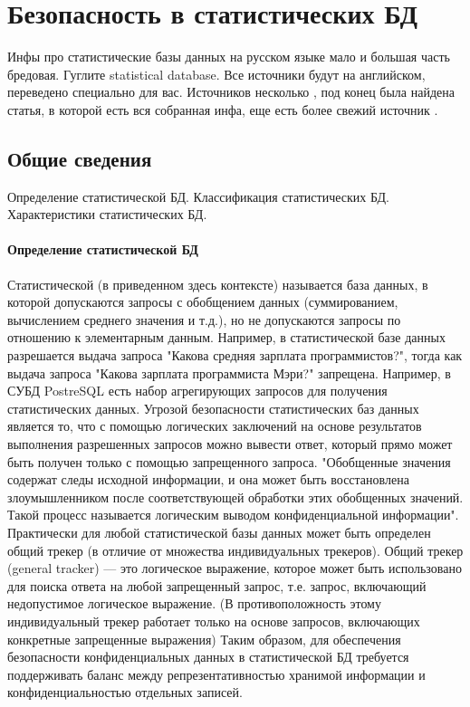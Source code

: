 \section{Безопасность в статистических БД}

Инфы про статистические базы данных на русском языке мало и большая часть бредовая. Гуглите statistical database. Все источники будут на английском, переведено специально для вас. Источников несколько \cite{ComputerSecurity2008} \cite{IntroBD2014}, под конец была найдена статья, \cite{SDB1989} в которой есть вся собранная инфа, еще есть более свежий источник \cite{SDB1999}.

\subsection{Общие сведения}
Определение статистической БД. Классификация статистических БД. Характеристики статистических БД.

\paragraph{Определение статистической БД}
Статистической (в приведенном здесь контексте) называется база данных, в которой допускаются запросы с обобщением данных (суммированием, вычислением среднего значения и т.д.), но не допускаются запросы по отношению к элементарным данным. Например, в статистической базе данных разрешается выдача запроса "Какова средняя зарплата программистов?", тогда как выдача запроса "Какова зарплата программиста Мэри?" запрещена. Например, в СУБД PostreSQL есть набор агрегирующих запросов для получения статистических данных.
Угрозой безопасности статистических баз данных является то, что с помощью логических заключений на основе результатов выполнения разрешенных запросов можно вывести ответ, который прямо может быть получен только с помощью запрещенного запроса. "Обобщенные значения содержат следы исходной информации, и она может быть восстановлена злоумышленником после соответствующей обработки этих обобщенных значений. Такой процесс называется логическим выводом конфиденциальной информации".
Практически для любой статистической базы данных может быть определен общий трекер (в отличие от множества индивидуальных трекеров). Общий трекер (general tracker) — это логическое выражение, которое может быть использовано для поиска ответа на любой запрещенный запрос, т.е. запрос, включающий недопустимое логическое выражение. (В противоположность этому индивидуальный трекер работает только на основе запросов, включающих конкретные запрещенные выражения)
Таким образом, для обеспечения безопасности конфиденциальных данных в статистической БД требуется поддерживать баланс между репрезентативностью хранимой информации и конфиденциальностью отдельных записей.

